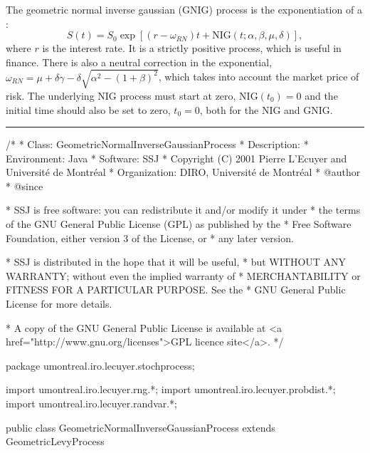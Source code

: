 

The geometric normal inverse gaussian (GNIG) process
is the exponentiation of a :
\begin{equation}
S(t) = S_0 \exp\left[ (r-\omega_{RN})t + \mbox{NIG}(t;\alpha,\beta,\mu,\delta) \right],
\end{equation}
where  $r$  is the interest rate.
It is a strictly positive process, which is useful in finance.
There is also a neutral
correction in the exponential, $\omega_{RN}= \mu + \delta\gamma-\delta
\sqrt{\alpha^2-(1+\beta)^2}$,
which takes into account the market price of risk.
The underlying NIG process must start at zero, NIG$(t_0) = 0 $
and the initial time should also be set to zero, $t_0 = 0$,
both for the NIG and GNIG.

\bigskip\hrule\bigskip

\begin{code}
\begin{hide}
/*
 * Class:        GeometricNormalInverseGaussianProcess
 * Description:  
 * Environment:  Java
 * Software:     SSJ 
 * Copyright (C) 2001  Pierre L'Ecuyer and Université de Montréal
 * Organization: DIRO, Université de Montréal
 * @author       
 * @since

 * SSJ is free software: you can redistribute it and/or modify it under
 * the terms of the GNU General Public License (GPL) as published by the
 * Free Software Foundation, either version 3 of the License, or
 * any later version.

 * SSJ is distributed in the hope that it will be useful,
 * but WITHOUT ANY WARRANTY; without even the implied warranty of
 * MERCHANTABILITY or FITNESS FOR A PARTICULAR PURPOSE.  See the
 * GNU General Public License for more details.

 * A copy of the GNU General Public License is available at
   <a href="http://www.gnu.org/licenses">GPL licence site</a>.
 */
\end{hide}
package umontreal.iro.lecuyer.stochprocess;\begin{hide}
import umontreal.iro.lecuyer.rng.*;
import umontreal.iro.lecuyer.probdist.*;
import umontreal.iro.lecuyer.randvar.*;

\end{hide}

public class GeometricNormalInverseGaussianProcess extends
                                                   GeometricLevyProcess \begin{hide} {
\end{hide}
\end{code}%
